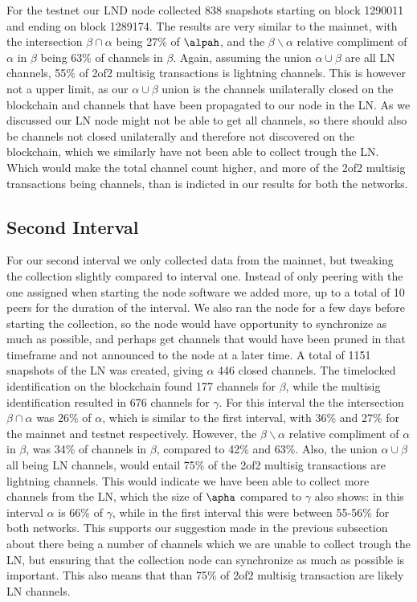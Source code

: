For the testnet our LND node collected 838 snapshots starting on block 1290011 and ending on block 1289174. The results are very similar to the mainnet, with the intersection $\beta \cap \alpha$ being 27\% of $\alpah$,
and the $\beta \backslash{} \alpha$ relative compliment of $\alpha$ in $\beta$ being 63\% of channels in $\beta$.
Again, assuming the union $\alpha \cup \beta$ are all LN channels, 55\% of 2of2 multisig transactions is lightning channels. This is however not a upper limit, as our $\alpha \cup \beta$ union is the channels unilaterally closed on the blockchain and channels that have been propagated to our node in the LN. As we discussed our LN node might not be able to get all channels, so there should also be channels not closed unilaterally and therefore not discovered on the blockchain, which we similarly have not been able to collect trough the LN. 
Which would make the total channel count higher, and more of the 2of2 multisig transactions being channels, than is indicted in our results for both the networks.

\subsection{Second Interval}


For our second interval we only collected data from the mainnet, but tweaking the collection slightly compared to interval one. Instead of only peering with the one assigned when starting the node software we added more, up to a total of 10 peers for the duration of the interval. We also ran the node for a few days before starting the collection, so the node would have opportunity to synchronize as much as possible, and perhaps get channels that would have been pruned in that timeframe and not announced to the node at a later time. A total of 1151 snapshots of the LN was created, giving $\alpha$ 446 closed channels. The timelocked identification on the blockchain found  177 channels for $\beta$, while the multisig identification resulted in 676 channels for $\gamma$. For this interval the the intersection $\beta \cap \alpha$ was 26\% of $\alpha$, which is similar to the first interval, with 36\% and 27\% for the mainnet and testnet respectively. However, the $\beta \backslash{} \alpha$ relative compliment of $\alpha$ in $\beta$, was 34\% of channels in $\beta$, compared to 42\% and 63\%. Also, the union $\alpha \cup \beta$ all being LN channels, would entail 75\% of the 2of2 multisig transactions are lightning channels. This would indicate we have been able to collect more channels from the LN, which the size of $\apha$ compared to $\gamma$ also shows: in this interval $\alpha$ is 66\% of $\gamma$, while in the first interval this were between 55-56\% for both networks. This supports our suggestion made in the previous subsection about there being a number of channels which we are unable to collect trough the LN, but ensuring that the collection node can synchronize as much as possible is important.
This also means that than 75\% of 2of2 multisig transaction are likely LN channels. 

